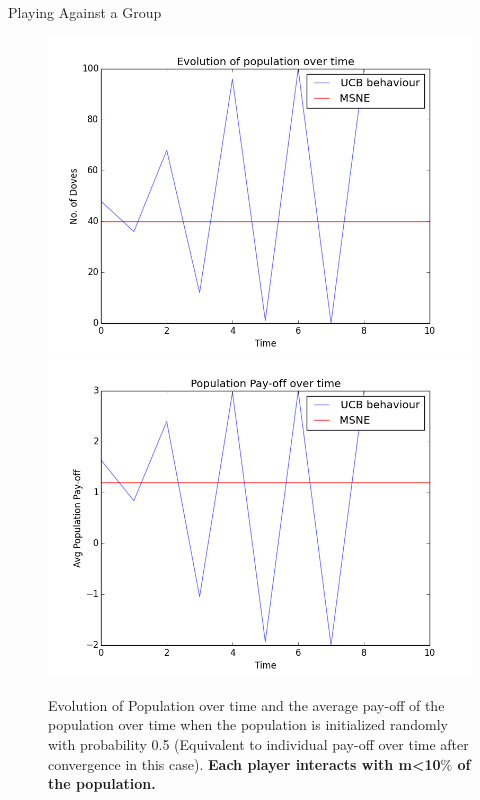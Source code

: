 \documentclass{IFES-beamer}
\begin{document}
        \begin{frame}{Playing Against a Group}
             \begin{figure}
                \centering
                \includegraphics[scale=0.25]{Images/UCB/Population/mini_100_10_epochs.png}
                \includegraphics[scale=0.25]{Images/UCB/Pay-off/pay-off_mini_100_10_epochs.png}
                \caption{Evolution of Population over time and the average pay-off of the population over time when the population is initialized randomly with probability 0.5 (Equivalent to individual pay-off over time after convergence in this case). \textbf{Each player interacts with m<10$\%$ of the population.}}
                \label{fig:my_label}
            \end{figure}
        \end{frame}
\end{document}

